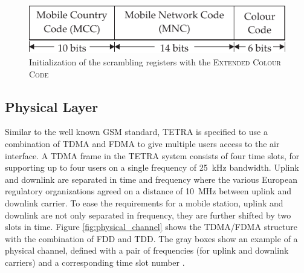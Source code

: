 \begin{figure}[htb]
	\centering
		\includegraphics[]{../kapitel04/figures/Extended_Colour_Code.pdf}
	\caption{Initialization of the scrambling registers with the \textsc{Extended Colour Code}}
	\label{fig:ECC}
\end{figure}


\subsection{Physical Layer}
\label{sec:cim_phy}

Similar to the well known \ac{GSM} standard, \ac{TETRA} is specified to use a combination of \ac{TDMA} and \ac{FDMA} to give multiple users access to the air interface. A \ac{TDMA} frame in the TETRA system consists of four time slots, for supporting up to four users on a single frequency of \SI{25}{kHz} bandwidth. Uplink and downlink are separated in time and frequency where the various European regulatory organizations agreed on a distance of \SI{10}{MHz} between uplink and downlink carrier. To ease the requirements for a mobile station, uplink and downlink are not only separated in frequency, they are further shifted by two slots in time. Figure \ref{fig:physical_channel} shows the \ac{TDMA}/\ac{FDMA} structure with the combination of \ac{FDD} and \ac{TDD}. The gray boxes show an example of a physical channel, defined with a pair of frequencies (for uplink and downlink carriers) and a corresponding time slot number \cite{ETSI07}. 

